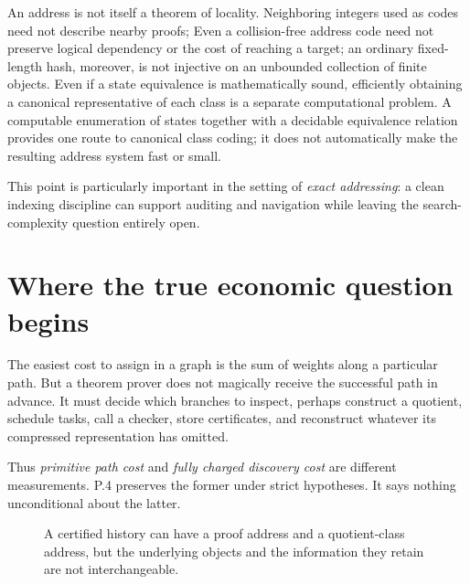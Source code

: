 \documentclass[11pt,letterpaper]{article}
\theoremstyle{plaincompact}
\begin{document}
An address is not itself a theorem of locality. Neighboring integers used as codes need not describe nearby proofs; Even a collision-free address code need not preserve logical dependency or the cost of reaching a target; an ordinary fixed-length hash, moreover, is not injective on an unbounded collection of finite objects. Even if a state equivalence is mathematically sound, efficiently obtaining a canonical representative of each class is a separate computational problem. A computable enumeration of states together with a decidable equivalence relation provides one route to canonical class coding; it does not automatically make the resulting address system fast or small.

This point is particularly important in the setting of \emph{exact addressing}: a clean indexing discipline can support auditing and navigation while leaving the search-complexity question entirely open.





\section{Where the true economic question begins}
The easiest cost to assign in a graph is the sum of weights along a particular path. But a theorem prover does not magically receive the successful path in advance. It must decide which branches to inspect, perhaps construct a quotient, schedule tasks, call a checker, store certificates, and reconstruct whatever its compressed representation has omitted.

Thus \emph{primitive path cost} and \emph{fully charged discovery cost} are different measurements. P.4 preserves the former under strict hypotheses. It says nothing unconditional about the latter.

\begin{figure}[H]
\centering
{}
\caption{A certified history can have a proof address and a quotient-class address, but the underlying objects and the information they retain are not interchangeable.}
\end{figure}
\end{document}
